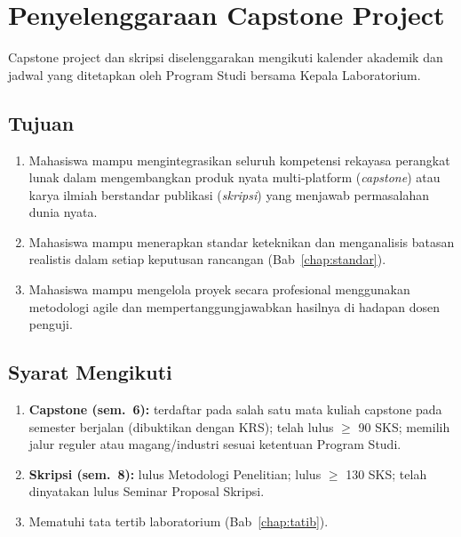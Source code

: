 \documentclass[12pt,a4paper]{report}
\begin{document}
\chapter{Penyelenggaraan Capstone Project}

Capstone project dan skripsi diselenggarakan mengikuti kalender akademik dan jadwal yang ditetapkan oleh Program Studi bersama Kepala Laboratorium.

\section{Tujuan}
\begin{enumerate}
\item Mahasiswa mampu mengintegrasikan seluruh kompetensi re\-ka\-ya\-sa pe\-rang\-kat lu\-nak dalam mengembangkan produk nyata multi-platform (\emph{capstone}) atau karya ilmiah berstandar publikasi (\emph{skripsi}) yang menjawab permasalahan dunia nyata.
\item Mahasiswa mampu menerapkan standar keteknikan dan menganalisis batasan realistis dalam setiap keputusan rancangan (Bab~\ref{chap:standar}).
\item Mahasiswa mampu mengelola proyek secara profesional menggunakan metodologi agile dan mempertanggungjawabkan hasilnya di hadapan dosen penguji.
\end{enumerate}

\section{Syarat Mengikuti}
\begin{enumerate}
\item \textbf{Capstone (sem.~6):} terdaftar pada salah satu mata kuliah capstone pada semester berjalan (dibuktikan dengan KRS); telah lulus $\geq$ 90 SKS; memilih jalur reguler atau magang/industri sesuai ketentuan Program Studi.
\item \textbf{Skripsi (sem.~8):} lulus Metodologi Penelitian; lulus $\geq$ 130 SKS; telah dinyatakan lulus Seminar Proposal Skripsi.
\item Mematuhi tata tertib laboratorium (Bab~\ref{chap:tatib}).
\end{enumerate}
\end{document}
